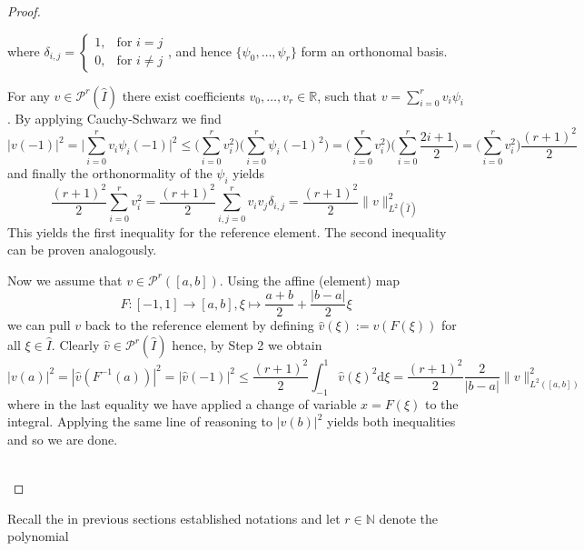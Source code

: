 \begin{proof}
\begin{proofstep}[Setup]
\[        \]
        where $\delta_{i,j} = 
        \begin{cases}
            1, &\text{for } i = j\\
            0, &\text{for } i\neq j   
        \end{cases}$, and hence $\{\psi_0,\ldots,\psi_r\}$ form an orthonomal basis.
    \end{proofstep} 
    \begin{proofstep}
        For any $v\in \mathcal{P}^r(\hat{I})$
        there exist coefficients $v_0,\ldots,v_r \in \mathbb{R}$, such that 
        $v = \sum_{i=0}^{r}v_i \psi_i$. By applying Cauchy-Schwarz we find
        \[
            |v(-1)|^2 = \Big|\sum_{i=0}^{r}v_i \psi_i(-1)\Big|^2 \leq \Big(\sum_{i=0}^{r} v_i^2 \Big)\Big(\sum_{i=0}^{r} \psi_i(-1)^2 \Big)
            = \Big(\sum_{i=0}^{r} v_i^2 \Big)\Big(\sum_{i=0}^{r} \frac{2i+1}{2} \Big)
            = \Big(\sum_{i=0}^{r} v_i^2 \Big)\frac{(r+1)^2}{2}
        \]
        and finally the orthonormality of the $\psi_i$ yields
        \[
            \frac{(r+1)^2}{2}\sum_{i=0}^{r} v_i^2  = \frac{(r+1)^2}{2}\sum_{i,j=0}^{r} v_i v_j \delta_{i,j}
            = \frac{(r+1)^2}{2} \|v\|_{L^2(\hat{I})}^2
        \]
        This yields the first inequality for the reference element. The second inequality
        can be proven analogously.
    \end{proofstep} 
    \begin{proofstep}
        Now we assume that $v \in \mathcal{P}^r([a,b])$.
        Using the affine (element) map 
        \[
            F:[-1,1] \to [a,b], \xi \mapsto \frac{a + b}{2} + \frac{|b-a|}{2}\xi
        \] 
        we can pull $v$ back to the reference element by defining
        $\widehat{v}(\xi):=v(F(\xi))$ for all $\xi \in \hat{I}$.
        Clearly $\widehat{v} \in \mathcal{P}^r(\hat{I})$ hence, by Step 2 we obtain
        \[
            |v(a)|^2 = |\widehat{v}(F^{-1}(a))|^2 = |\widehat{v}(-1)|^2 
            \leq \frac{(r+1)^2}{2}\int_{-1}^{1}\widehat{v}(\xi)^2 \text{d}\xi =
            \frac{(r+1)^2}{2}\frac{2}{|b-a|}\|v\|_{L^2([a,b])}^2 
        \] 
        where in the last equality we have applied a change of variable $x=F(\xi)$ to the integral.
        Applying the same line of reasoning to $|v(b)|^2$ yields both inequalities
        and so we are done.
    \end{proofstep}
    \\
\end{proof}
\medskip
Recall the in previous sections established notations and let $r\in \mathbb{N}$ denote the polynomial 
